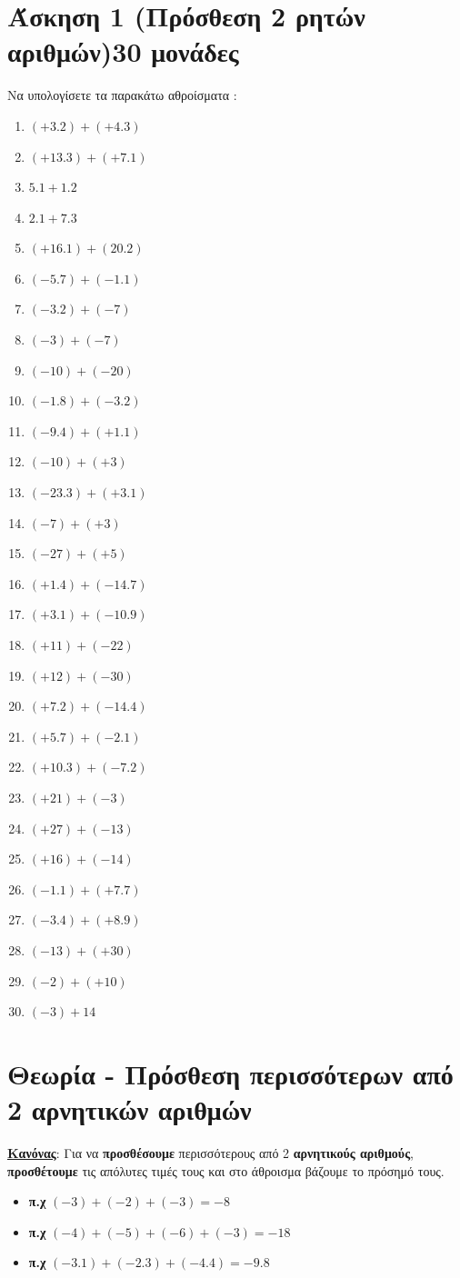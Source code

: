 \documentclass[a4paper,10pt]{report}
\begin{document}
\section*{Άσκηση 1  (Πρόσθεση 2 ρητών αριθμών)\hfill \small{30 μονάδες}}
Να υπολογίσετε τα παρακάτω αθροίσματα :
\begin{enumerate}[1)]
 \item $(+3.2)+(+4.3)$
 \item $(+13.3)+(+7.1)$
 \item $5.1+1.2$
 \item $2.1+7.3$
 \item $(+16.1)+(20.2)$
 \item $(-5.7)+(-1.1)$
 \item $(-3.2)+(-7)$
 \item $(-3)+(-7)$
 \item $(-10)+(-20)$
 \item $(-1.8)+(-3.2)$
 \item $(-9.4)+(+1.1)$
 \item $(-10)+(+3)$
 \item $(-23.3)+(+3.1)$
 \item $(-7)+(+3)$
 \item $(-27)+(+5)$
 \item $(+1.4)+(-14.7)$
 \item $(+3.1)+(-10.9)$
 \item $(+11)+(-22)$
 \item $(+12)+(-30)$
 \item $(+7.2)+(-14.4)$
 \item $(+5.7)+(-2.1)$
 \item $(+10.3)+(-7.2)$
 \item $(+21)+(-3)$
 \item $(+27)+(-13)$
 \item $(+16)+(-14)$
 \item $(-1.1)+(+7.7)$
 \item $(-3.4)+(+8.9)$
 \item $(-13)+(+30)$
 \item $(-2)+(+10)$
 \item $(-3)+14$
\end{enumerate}

\section*{Θεωρία - Πρόσθεση περισσότερων από 2 αρνητικών αριθμών\hfill \small{}}
\textbf{\underline{Κανόνας}}: Για να \textbf{προσθέσουμε} περισσότερους από 2 \textbf{αρνητικούς αριθμούς}, 
\textbf{προσθέτουμε} τις απόλυτες τιμές τους και στο άθροισμα βάζουμε το πρόσημό τους.
\begin{itemize}
 \item \textbf{π.χ} $(-3)+(-2)+(-3)=-8$
 \item \textbf{π.χ} $(-4)+(-5)+(-6)+(-3)=-18$
 \item \textbf{π.χ} $(-3.1)+(-2.3)+(-4.4)=-9.8$
\end{itemize}
\end{document}
